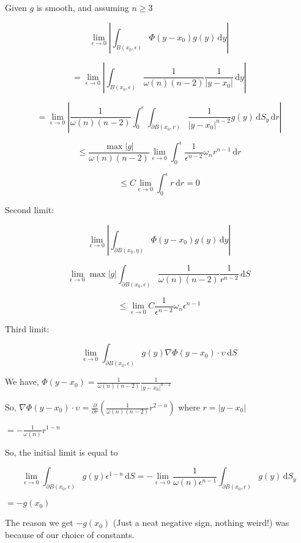 \documentclass{article}
\theoremstyle{definition}
\begin{document}
Given \(g\) is smooth, and assuming \(n\geq 3\) 

\[
    \lim_{\epsilon  \to 0} \left\vert \int_{B(x_0,\epsilon)}^{} \Phi(y - x_0)g(y) \,\mathrm{d}y \right\vert
\]

\[
    =\lim_{\epsilon  \to 0} \left\vert \int_{B(x_0,\epsilon )}^{} \frac{1}{\omega (n)(n-2)}\frac{1}{\vert y - x_0 \vert } \,\mathrm{d}y \right\vert 
\]

\[
    =\lim_{\epsilon \to 0} \left\vert \frac{1}{\omega (n)(n-2)} \int_{0}^{\epsilon} \int_{\partial B(x_0,r)}^{} \frac{1}{\vert y - x_0 \vert ^{n-2}}g(y) \,\mathrm{d}S_y  \,\mathrm{d}r \right\vert
\]

\[
    \leq \frac{\max \vert g \vert}{\omega (n)(n-2)} \lim_{\epsilon  \to 0} \int_{0}^{\epsilon } \frac{1}{\epsilon ^{n-2}} \omega_n r^{n-1}  \,\mathrm{d}r 
\]

\[
    \leq C \lim_{\epsilon  \to 0} \int_{0}^{\epsilon } r \,\mathrm{d}r = 0
\]

Second limit:

\[
    \lim_{\epsilon  \to 0} \left\vert \int_{\partial B(x_0,\eta )}^{} \Phi(y-x_0)g(y) \,\mathrm{d}y  \right\vert  
\]

\[
    \lim_{\epsilon  \to 0} \max \vert g \vert \int_{\partial B(x_0,\epsilon )}^{} \frac{1}{\omega (n)(n-2)}\frac{1}{r^{n-2}} \,\mathrm{d}S 
\]

\[
    \leq \lim_{\epsilon \to 0} C \frac{1}{\epsilon ^{n-2}} \omega _n \epsilon^{n-1}
\]

Third limit:

\[
    \lim_{\epsilon  \to 0} \int_{\partial B(x_0,\epsilon )}^{} g(y)\nabla\Phi(y-x_0)\cdot \upsilon  \,\mathrm{d}S 
\]

We have, \(\Phi(y-x_0)=\frac{1}{\omega (n)(n-2)}\frac{1}{\vert y-x_0 \vert ^{n-2}}\) 

So, \(\nabla\Phi(y-x_0)\cdot\upsilon = \frac{\partial }{\partial r} \left( \frac{1}{\omega (n)(n-2)} r^{2-n}  \right) \) where \(r=\vert y-x_0 \vert \) 

\(=-\frac{1}{\omega (n)}r^{1-n}\) 

So, the initial limit is equal to

\[
    \lim_{\epsilon  \to 0} \int_{\partial B(x_0,\epsilon )}^{} g(y) \epsilon ^{1-n} \,\mathrm{d}S = -\lim_{\epsilon  \to 0} \frac{1}{\omega (n)\epsilon ^{n-1}}\int_{\partial B(x_0,\epsilon )}^{} g(y) \,\mathrm{d}S_y  
\]

\(=-g(x_0)\) 

The reason we get \(-g(x_0)\) (Just a neat negative sign, nothing weird!) was because of our choice of constants.
\end{document}
